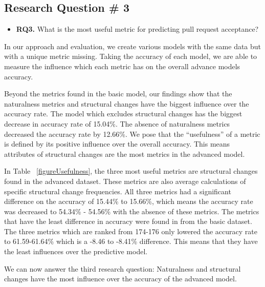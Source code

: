 \documentclass[10pt, conference]{IEEEtran}
\begin{document}
\subsection{Research Question \# 3}
\begin{mdframed} 
\begin{itemize}
\item \textbf{RQ3.} What is the most useful metric for predicting pull request acceptance?
\end{itemize}
\end{mdframed}

In our approach and evaluation, we create various models with the same data but with a unique metric missing. Taking the accuracy of each model, we are able to measure the influence which each metric has on the overall advance model\textquotesingle s accuracy. 

Beyond the metrics found in the basic model, our findings show that the naturalness metrics and structural changes have the biggest influence over the accuracy rate. The model which excludes structural changes has the biggest decrease in accuracy rate of 15.04\%. The absence of naturalness metrics decreased the accuracy rate by 12.66\%. We pose that the \enquote{usefulness} of a metric is defined by its positive influence over the overall accuracy. This means attributes of structural changes are the most  metrics in the advanced model.

In Table ~\ref{figureUsefulness}, the three most useful metrics are structural changes found in the advanced dataset. These metrics are also average calculations of specific structural change frequencies. All three metrics had a significant difference on the accuracy of 15.44\% to 15.66\%, which means the accuracy rate was decreased to 54.34\% - 54.56\% with the absence of these metrics. The metrics that have the least difference in accuracy were found in from the basic dataset. The three metrics which are ranked from 174-176 only lowered the accuracy rate to 61.59-61.64\% which is a -8.46 to -8.41\% difference. This means that they have the least influences over the predictive model.

We can now answer the third research question: Naturalness and structural changes have the most influence over the accuracy of the advanced model. 
\end{document}
